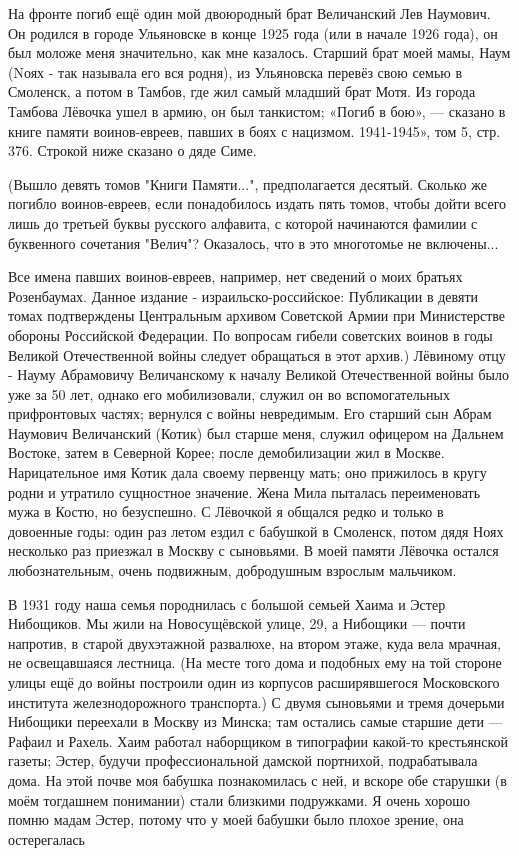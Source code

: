 \label{054-1}
На фронте погиб ещё один мой двоюродный брат Величанский Лев Наумович. Он родился в городе Ульяновске в конце 1925 года (или в начале 1926 года), он был моложе меня значительно, как мне казалось. Старший брат моей мамы, Наум (Nоях - так называла его вся родня), из Ульяновска перевёз свою семью в Смоленск, а потом в Тамбов, где жил самый младший брат Мотя. Из города Тамбова Лёвочка ушел в армию, он был танкистом; «Погиб в бою», — сказано в книге памяти воинов-евреев, павших в боях с нацизмом. 1941-1945», том 5, стр. 376. Строкой ниже сказано о дяде Симе.

(Вышло девять томов "Книги Памяти...", предполагается десятый. Сколько же погибло воинов-евреев, если понадобилось издать пять томов, чтобы дойти всего лишь до третьей буквы русского алфавита, с которой начинаются фамилии с буквенного сочетания "Велич"? Оказалось, что в это многотомье не включены...

\label{055-1}
Все имена павших воинов-евреев, например, нет сведений о моих братьях Розенбаумах. Данное издание - израильско-российское: Публикации в девяти томах подтверждены Центральным архивом Советской Армии при Министерстве обороны Российской Федерации. По вопросам гибели советских воинов в годы Великой Отечественной войны следует обращаться в этот архив.)
Лёвиному отцу - Науму Абрамовичу Величанскому к началу Великой Отечественной войны было уже за 50 лет, однако его мобилизовали, служил он во вспомогательных прифронтовых частях; вернулся с войны невредимым. Его старший сын Абрам Наумович Величанский (Котик) был старше меня, служил офицером на Дальнем Востоке, затем в Северной Корее; после демобилизации жил в Москве. Нарицательное имя Котик дала своему первенцу мать; оно прижилось в кругу родни и утратило сущностное значение. Жена Мила пыталась переименовать мужа в Костю, но безуспешно. С Лёвочкой я общался редко и только в довоенные годы: один раз летом ездил с бабушкой в Смоленск, потом дядя Ноях несколько раз приезжал в Москву с сыновьями. В моей памяти Лёвочка остался любознательным, очень подвижным, добродушным взрослым мальчиком.

\label{056-1}
В 1931 году наша семья породнилась с большой семьей Хаима и Эстер Нибощиков. Мы жили на Новосущёвской улице, 29, а Нибощики — почти напротив, в старой двухэтажной развалюхе, на втором этаже, куда вела мрачная, не освещавшаяся лестница. (На месте того дома и подобных ему на той стороне улицы ещё до войны построили один из корпусов расширявшегося Московского института железнодорожного транспорта.) С двумя сыновьями и тремя дочерьми Нибощики переехали в Москву из Минска; там остались самые старшие дети — Рафаил и Рахель. Хаим работал наборщиком в типографии какой-то крестьянской газеты; Эстер, будучи профессиональной дамской портнихой, подрабатывала дома. На этой почве моя бабушка познакомилась с ней, и вскоре обе старушки (в моём тогдашнем понимании) стали близкими подружками. Я очень хорошо помню мадам Эстер, потому что у моей бабушки было плохое зрение, она остерегалась


